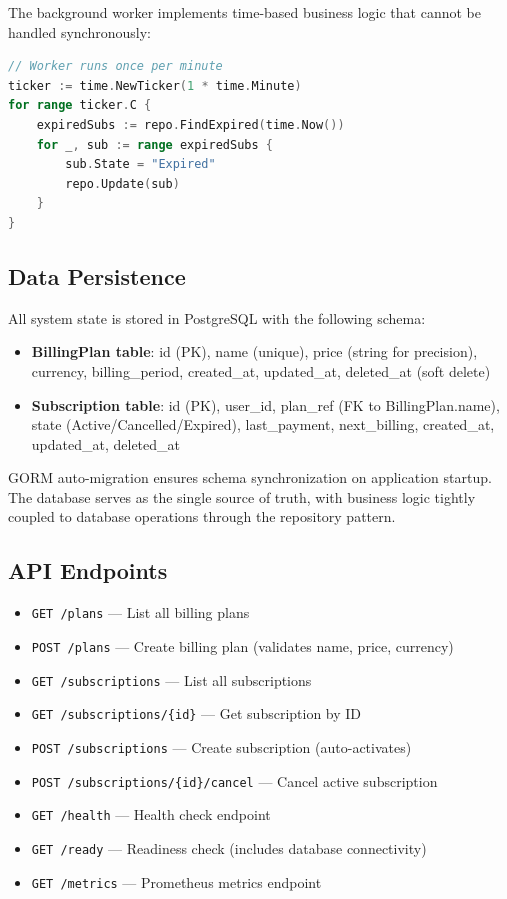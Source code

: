 The background worker implements time-based business logic that cannot be handled synchronously:

\begin{lstlisting}[language=Go, caption={Background expiration checker worker}, label={lst:worker}]
// Worker runs once per minute
ticker := time.NewTicker(1 * time.Minute)
for range ticker.C {
    expiredSubs := repo.FindExpired(time.Now())
    for _, sub := range expiredSubs {
        sub.State = "Expired"
        repo.Update(sub)
    }
}
\end{lstlisting}

\subsection{Data Persistence}

All system state is stored in PostgreSQL with the following schema:

\begin{itemize}
    \item \textbf{BillingPlan table}: id (PK), name (unique), price (string for precision), currency, billing\_period, created\_at, updated\_at, deleted\_at (soft delete)
    \item \textbf{Subscription table}: id (PK), user\_id, plan\_ref (FK to BillingPlan.name), state (Active/Cancelled/Expired), last\_payment, next\_billing, created\_at, updated\_at, deleted\_at
\end{itemize}

GORM auto-migration ensures schema synchronization on application startup. The database serves as the single source of truth, with business logic tightly coupled to database operations through the repository pattern.

\subsection{API Endpoints}

\begin{itemize}
    \item \texttt{GET /plans} --- List all billing plans
    \item \texttt{POST /plans} --- Create billing plan (validates name, price, currency)
    \item \texttt{GET /subscriptions} --- List all subscriptions
    \item \texttt{GET /subscriptions/\{id\}} --- Get subscription by ID
    \item \texttt{POST /subscriptions} --- Create subscription (auto-activates)
    \item \texttt{POST /subscriptions/\{id\}/cancel} --- Cancel active subscription
    \item \texttt{GET /health} --- Health check endpoint
    \item \texttt{GET /ready} --- Readiness check (includes database connectivity)
    \item \texttt{GET /metrics} --- Prometheus metrics endpoint
\end{itemize}

